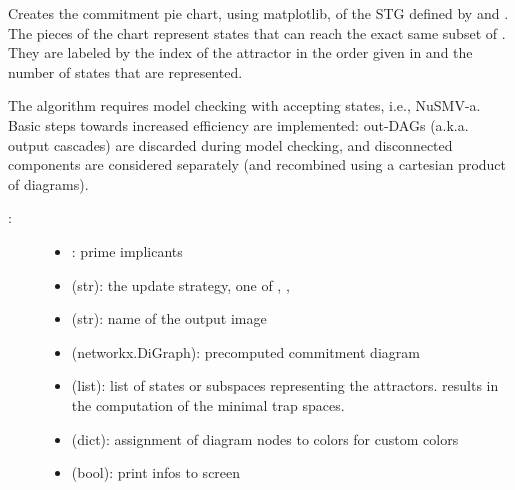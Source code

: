 \documentclass[letterpaper,10pt,english]{sphinxmanual}
\begin{document}
\begin{fulllineitems}
\label{\detokenize{Basins:PyBoolNet.Basins.commitment_pie}}
Creates the commitment pie chart, using matplotlib, of the STG defined by  and .
The pieces of the chart represent states that can reach the exact same subset of .
They are labeled by the index of the attractor in the order given in  and the number of states
that are represented.

The algorithm requires model checking with accepting states, i.e., NuSMV-a.
Basic steps towards increased efficiency are implemented:
out-DAGs (a.k.a. output cascades) are discarded during model checking, and
disconnected components are considered separately (and recombined using a cartesian product of diagrams).
\begin{description}
\item[{:}] \leavevmode\begin{itemize}
\item {} 
: prime implicants

\item {} 
 (str): the update strategy, one of , , 

\item {} 
 (str): name of the output image

\item {} 
 (networkx.DiGraph): precomputed commitment diagram

\item {} 
 (list): list of states or subspaces representing the attractors.  results in the computation of the minimal trap spaces.

\item {} 
 (dict): assignment of diagram nodes to colors for custom colors

\item {} 
 (bool): print infos to screen


\end{itemize}
\end{description}
\end{fulllineitems}
\end{document}
